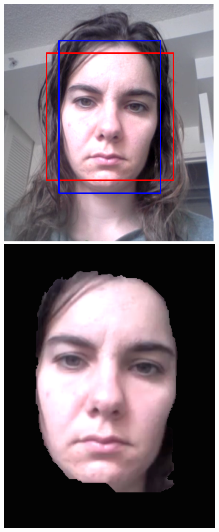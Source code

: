 \documentclass[10pt,twocolumn,letterpaper]{article}
\begin{document}
\begin{figure}
\begin{center}
	\includegraphics[scale=0.3]{figures/segment_bb}\\
	\includegraphics[scale=0.3]{figures/my_seg_it1}

\end{center}
\end{figure}
\end{document}
